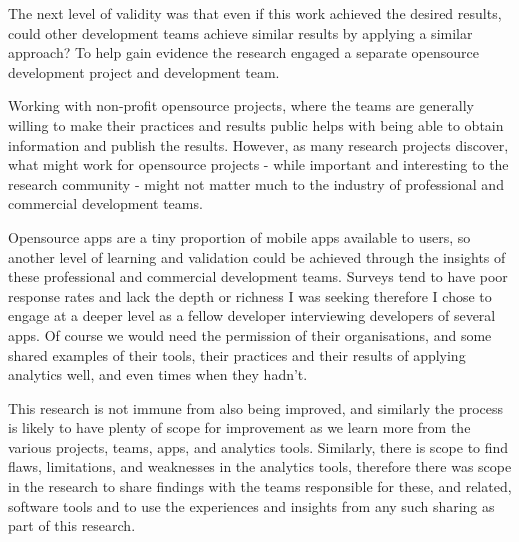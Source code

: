 The next level of validity was that even if this work achieved the desired results, could other development teams achieve similar results by applying a similar approach? To help gain evidence the research engaged a separate opensource development project and development team. 

Working with non-profit opensource projects, where the teams are generally willing to make their practices and results public helps with being able to obtain information and publish the results. However, as many research projects discover, what might work for opensource projects - while important and interesting to the research community - might not matter much to the industry of professional and commercial development teams. 

Opensource apps are a tiny proportion of mobile apps available to users, so another level of learning and validation could be achieved through the insights of these professional and commercial development teams. Surveys tend to have poor response rates and lack the depth or richness I was seeking therefore I chose to engage at a deeper level as a fellow developer interviewing developers of several apps. Of course we would need the permission of their organisations, and some shared examples of their tools, their practices and their results of applying analytics well, and even times when they hadn't.

This research is not immune from also being improved, and similarly the process is likely to have plenty of scope for improvement as we learn more from the various projects, teams, apps, and analytics tools. Similarly, there is scope to find flaws, limitations, and weaknesses in the analytics tools, therefore there was scope in the research to share findings with the teams responsible for these, and related, software tools and to use the experiences and insights from any such sharing as part of this research.

